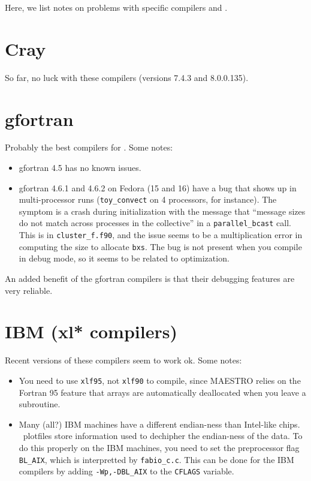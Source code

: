 Here, we list notes on problems with specific compilers and \maestro.


\section{Cray}

So far, no luck with these compilers (versions 7.4.3 and 8.0.0.135).


\section{gfortran}

Probably the best compilers for \maestro.  
Some notes:
\begin{itemize}
\item gfortran 4.5 has no known issues.
\item gfortran 4.6.1 and 4.6.2 on Fedora (15 and 16) have a bug that 
shows up in multi-processor runs ({\tt toy\_convect} on 4 processors, for instance).
The symptom is a crash during initialization with the message that
``message sizes do not match across processes in the collective'' in a
{\tt parallel\_bcast} call.  This is in {\tt cluster\_f.f90}, and the issue seems
to be a multiplication error in computing the size to allocate {\tt bxs}.
The bug is not present when you compile in debug mode, so it seems to be
related to optimization.
\end{itemize}

An added benefit of the gfortran compilers is that their debugging
features are very reliable.


\section{IBM (xl* compilers)}

Recent versions of these compilers seem to work ok.  Some notes:
\begin{itemize}
\item You need to use {\tt xlf95}, not {\tt xlf90} to compile, since
  MAESTRO relies on the Fortran 95 feature that arrays are
  automatically deallocated when you leave a subroutine.

\item Many (all?) IBM machines have a different endian-ness than
  Intel-like chips.  \boxlib\ plotfiles store information used to
  dechipher the endian-ness of the data.  To do this properly on
  the IBM machines, you need to set the preprocessor flag {\tt BL\_AIX},
  which is interpretted by {\tt fabio\_c.c}.  This can be done for the
  IBM compilers by adding {\tt -Wp,-DBL\_AIX} to the {\tt CFLAGS} variable.

\end{itemize}

